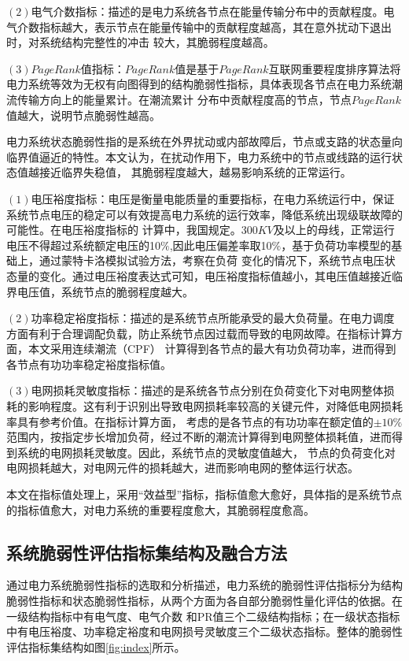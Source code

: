 $(2)$电气介数指标：描述的是电力系统各节点在能量传输分布中的贡献程度。电气介数指标越大，表示节点在能量传输中的贡献程度越高，其在意外扰动下退出时，对系统结构完整性的冲击
较大，其脆弱程度越高。

$(3)$$PageRank$值指标：$PageRank$值是基于$PageRank$互联网重要程度排序算法将电力系统等效为无权有向图得到的结构脆弱性指标，具体表现各节点在电力系统潮流传输方向上的能量累计。在潮流累计
分布中贡献程度高的节点，节点$PageRank$值越大，说明节点脆弱性越高。

电力系统状态脆弱性指的是系统在外界扰动或内部故障后，节点或支路的状态量向临界值逼近的特性。本文认为，在扰动作用下，电力系统中的节点或线路的运行状态值越接近临界失稳值，
其脆弱程度越大，越易影响系统的正常运行。

$(1)$电压裕度指标：电压是衡量电能质量的重要指标，在电力系统运行中，保证系统节点电压的稳定可以有效提高电力系统的运行效率，降低系统出现级联故障的可能性。在电压裕度指标的
计算中，我国规定。300$KV$及以上的母线，正常运行电压不得超过系统额定电压的10$\%$,因此电压偏差率取10$\%$，基于负荷功率模型的基础上，通过蒙特卡洛模拟试验方法，考察在负荷
变化的情况下，系统节点电压状态量的变化。通过电压裕度表达式可知，电压裕度指标值越小，其电压值越接近临界电压值，系统节点的脆弱程度越大。

$(2)$功率稳定裕度指标：描述的是系统节点所能承受的最大负荷量。在电力调度方面有利于合理调配负载，防止系统节点因过载而导致的电网故障。在指标计算方面，本文采用连续潮流（CPF）
计算得到各节点的最大有功负荷功率，进而得到各节点有功功率稳定裕度指标值。

$(3)$电网损耗灵敏度指标：描述的是系统各节点分别在负荷变化下对电网整体损耗的影响程度。这有利于识别出导致电网损耗率较高的关键元件，对降低电网损耗率具有参考价值。在指标计算方面，
考虑的是各节点的有功功率在额定值的$\pm 10 \%$范围内，按指定步长增加负荷，经过不断的潮流计算得到电网整体损耗值，进而得到系统的电网损耗灵敏度。因此，系统节点的灵敏度值越大，
节点的负荷变化对电网损耗越大，对电网元件的损耗越大，进而影响电网的整体运行状态。

本文在指标值处理上，采用“效益型”指标，指标值愈大愈好，具体指的是系统节点的指标值愈大，对电力系统的重要程度愈大，其脆弱程度愈高。

\subsection{系统脆弱性评估指标集结构及融合方法}
\label{sec:IndexSys}
通过电力系统脆弱性指标的选取和分析描述，电力系统的脆弱性评估指标分为结构脆弱性指标和状态脆弱性指标，从两个方面为各自部分脆弱性量化评估的依据。在一级结构指标中有电气度、电气介数
和PR值三个二级结构指标；在一级状态指标中有电压裕度、功率稳定裕度和电网损号灵敏度三个二级状态指标。整体的脆弱性评估指标集结构如图\ref{fig:index}所示。

